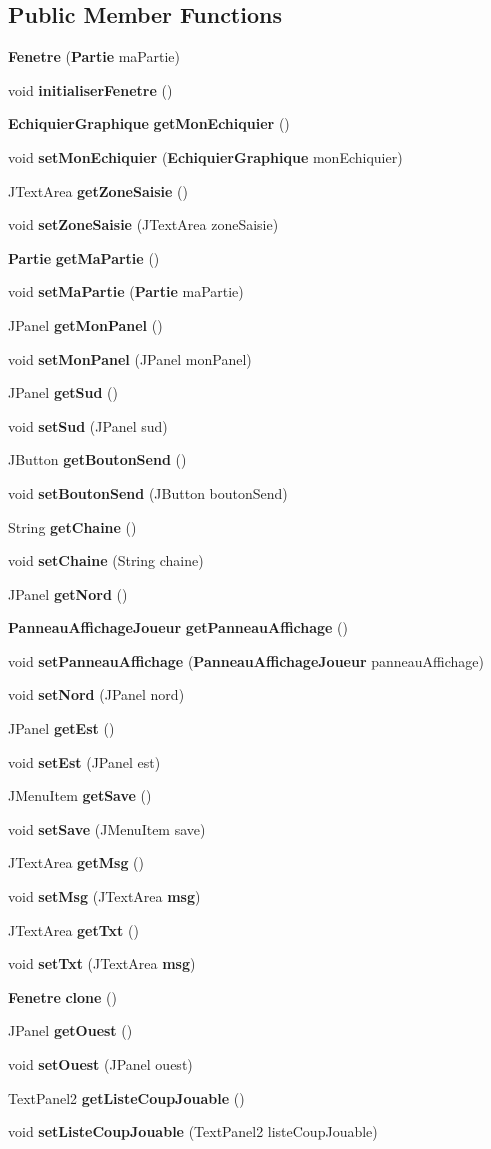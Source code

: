 \subsection*{Public Member Functions}
\begin{DoxyCompactItemize}
\item 
{\bf Fenetre} ({\bf Partie} ma\-Partie)
\item 
void {\bf initialiser\-Fenetre} ()
\item 
{\bf Echiquier\-Graphique} {\bf get\-Mon\-Echiquier} ()
\item 
void {\bf set\-Mon\-Echiquier} ({\bf Echiquier\-Graphique} mon\-Echiquier)
\item 
J\-Text\-Area {\bf get\-Zone\-Saisie} ()
\item 
void {\bf set\-Zone\-Saisie} (J\-Text\-Area zone\-Saisie)
\item 
{\bf Partie} {\bf get\-Ma\-Partie} ()
\item 
void {\bf set\-Ma\-Partie} ({\bf Partie} ma\-Partie)
\item 
J\-Panel {\bf get\-Mon\-Panel} ()
\item 
void {\bf set\-Mon\-Panel} (J\-Panel mon\-Panel)
\item 
J\-Panel {\bf get\-Sud} ()
\item 
void {\bf set\-Sud} (J\-Panel sud)
\item 
J\-Button {\bf get\-Bouton\-Send} ()
\item 
void {\bf set\-Bouton\-Send} (J\-Button bouton\-Send)
\item 
String {\bf get\-Chaine} ()
\item 
void {\bf set\-Chaine} (String chaine)
\item 
J\-Panel {\bf get\-Nord} ()
\item 
{\bf Panneau\-Affichage\-Joueur} {\bf get\-Panneau\-Affichage} ()
\item 
void {\bf set\-Panneau\-Affichage} ({\bf Panneau\-Affichage\-Joueur} panneau\-Affichage)
\item 
void {\bf set\-Nord} (J\-Panel nord)
\item 
J\-Panel {\bf get\-Est} ()
\item 
void {\bf set\-Est} (J\-Panel est)
\item 
J\-Menu\-Item {\bf get\-Save} ()
\item 
void {\bf set\-Save} (J\-Menu\-Item save)
\item 
J\-Text\-Area {\bf get\-Msg} ()
\item 
void {\bf set\-Msg} (J\-Text\-Area {\bf msg})
\item 
J\-Text\-Area {\bf get\-Txt} ()
\item 
void {\bf set\-Txt} (J\-Text\-Area {\bf msg})
\item 
{\bf Fenetre} {\bf clone} ()
\item 
J\-Panel {\bf get\-Ouest} ()
\item 
void {\bf set\-Ouest} (J\-Panel ouest)
\item 
Text\-Panel2 {\bf get\-Liste\-Coup\-Jouable} ()
\item 
void {\bf set\-Liste\-Coup\-Jouable} (Text\-Panel2 liste\-Coup\-Jouable)
\end{DoxyCompactItemize}
